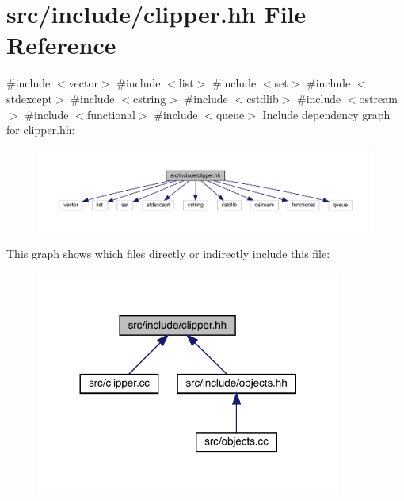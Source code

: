 \hypertarget{clipper_8hh}{}\section{src/include/clipper.hh File Reference}
\label{clipper_8hh}
{\ttfamily \#include $<$vector$>$}\newline
{\ttfamily \#include $<$list$>$}\newline
{\ttfamily \#include $<$set$>$}\newline
{\ttfamily \#include $<$stdexcept$>$}\newline
{\ttfamily \#include $<$cstring$>$}\newline
{\ttfamily \#include $<$cstdlib$>$}\newline
{\ttfamily \#include $<$ostream$>$}\newline
{\ttfamily \#include $<$functional$>$}\newline
{\ttfamily \#include $<$queue$>$}\newline
Include dependency graph for clipper.\+hh\+:
\nopagebreak
\begin{figure}[H]
\begin{center}
\leavevmode
\includegraphics[width=350pt]{clipper_8hh__incl}
\end{center}
\end{figure}
This graph shows which files directly or indirectly include this file\+:
\nopagebreak
\begin{figure}[H]
\begin{center}
\leavevmode
\includegraphics[width=284pt]{clipper_8hh__dep__incl}
\end{center}
\end{figure}
